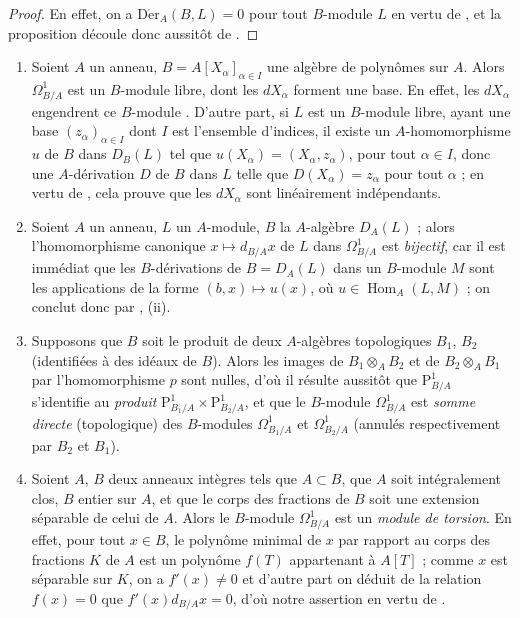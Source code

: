 \begin{proof}
En effet, on a $\operatorname{D\acute{e}r}_A(B,L)=0$ pour tout $B$-module
$L$ en vertu de , et la proposition découle donc aussitôt
de .
\end{proof}

\begin{examples}[20.4.13]
\label{0.20.4.13-fr}
\begin{enumerate}
  \item[\rm(i)] Soient $A$ un anneau,
  $B=A[X_\alpha]_{\alpha\in I}$ une algèbre de polynômes sur $A$. Alors
  $\Omega^1_{B/A}$ est un $B$-module libre, dont les $dX_\alpha$ forment une
  base. En effet, les $dX_\alpha$ engendrent ce $B$-module
  . D'autre part, si $L$ est un $B$-module libre, ayant
  une base $(z_\alpha)_{\alpha\in I}$ dont $I$ est l'ensemble d'indices, il
  existe un $A$-homomorphisme $u$ de $B$ dans $D_B(L)$ tel que
  $u(X_\alpha)=(X_\alpha,z_\alpha)$, pour tout $\alpha\in I$, donc
   une $A$-dérivation $D$ de $B$ dans $L$ telle que
  $D(X_\alpha)=z_\alpha$ pour tout $\alpha$ ; en vertu de
  , cela prouve que les $dX_\alpha$ sont linéairement
  indépendants.
  \item[\rm(ii)] Soient $A$ un anneau, $L$ un $A$-module, $B$ la
  $A$-algèbre $D_A(L)$ ; alors l'homomorphisme canonique
  $x\mapsto d_{B/A}x$ de $L$ dans $\Omega^1_{B/A}$ est \emph{bijectif}, car
  il est immédiat que les $B$-dérivations de $B=D_A(L)$ dans un $B$-module
  $M$ sont les applications de la forme $(b,x)\mapsto u(x)$, où
  $u\in\operatorname{Hom}_A(L,M)$ ; on conclut donc par
  , (ii).
  \item[\rm(iii)] Supposons que $B$ soit le produit de deux $A$-algèbres
  topologiques $B_1$, $B_2$ (identifiées à des idéaux de $B$). Alors les
  images de $B_1\otimes_A B_2$ et de $B_2\otimes_A B_1$ par l'homomorphisme
  $p$  sont nulles, d'où il résulte aussitôt que
  $\mathrm{P}^1_{B/A}$ s'identifie au \emph{produit}
  $\mathrm{P}^1_{B_1/A}\times\mathrm{P}^1_{B_2/A}$, et que le $B$-module
  $\Omega^1_{B/A}$ est \emph{somme directe} (topologique) des $B$-modules
  $\Omega^1_{B_1/A}$ et $\Omega^1_{B_2/A}$ (annulés respectivement par
  $B_2$ et $B_1$).
  \item[\rm(iv)] Soient $A$, $B$ deux anneaux intègres tels que $A\subset
  B$, que $A$ soit intégralement clos, $B$ entier sur $A$, et que le corps
  des fractions de $B$ soit une extension séparable de celui de $A$. Alors
  le $B$-module $\Omega^1_{B/A}$ est un \emph{module de torsion}. En effet,
  pour tout $x\in B$, le polynôme minimal de $x$ par rapport au corps des
  fractions $K$ de $A$ est un polynôme $f(T)$ appartenant à $A[T]$ ; comme
  $x$ est séparable sur $K$, on a $f'(x)\neq0$ et d'autre part on déduit de
  la relation $f(x)=0$ que $f'(x)d_{B/A}x=0$, d'où notre assertion en vertu
  de .
\end{enumerate}
\end{examples}

